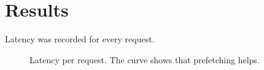 \section{Results}
Latency was recorded for every request.
\begin{figure}
\caption{Latency per request. The curve shows that prefetching helps.}
\end{figure}
